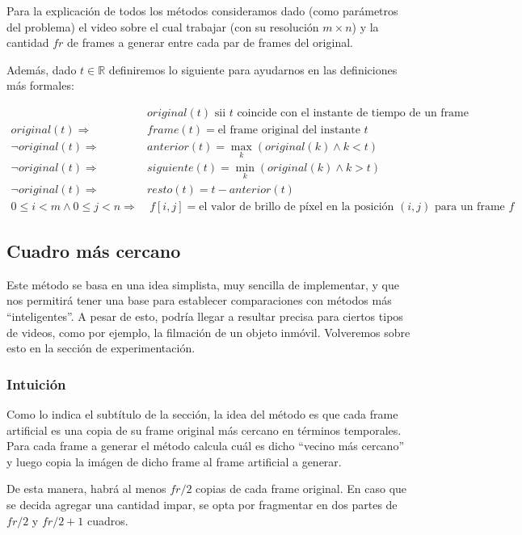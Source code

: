 Para la explicación de todos los métodos consideramos dado (como parámetros del problema) el video sobre el cual trabajar (con su resolución $m \times n$) y la cantidad $fr$ de frames a generar entre cada par de frames del original.

Además, dado $t \in \mathbb{R}$ definiremos lo siguiente para ayudarnos en las definiciones más formales:

\begin{align*}
    &original(t) \text{ sii } t \text{ coincide con el instante de tiempo de un frame original}\\
    original(t) \Rightarrow\ &frame(t)=\text{el frame original del instante $t$}\\
    \neg original(t) \Rightarrow\ &anterior(t) = \max_{k}(original(k) \wedge k < t)\\
    \neg original(t) \Rightarrow\ &siguiente(t) = \min_{k}(original(k) \wedge k > t)\\
    \neg original(t) \Rightarrow\ &resto(t) = t-anterior(t)\\
    0 \leq i < m \wedge 0 \leq j < n \Rightarrow&\ f[i,j] =\text{el valor de brillo de píxel en la posición $(i, j)$ para un frame $f$}
\end{align*}

\subsection{Cuadro m\'as cercano}

Este m\'etodo se basa en una idea simplista, muy sencilla de implementar, y que nos permitirá tener una base para establecer comparaciones con métodos más ``inteligentes''. A pesar de esto, podría llegar a resultar precisa para ciertos tipos de videos, como por ejemplo, la filmaci\'on de un objeto inmóvil. Volveremos sobre esto en la sección de experimentación.

\subsubsection*{\bf{Intuición}}

Como lo indica el subt\'itulo de la secci\'on, la idea del método es que cada frame artificial es una copia de su frame original más cercano en términos temporales. Para cada frame a generar el método calcula cuál es dicho ``vecino más cercano'' y luego copia la im\'agen de dicho frame al frame artificial a generar. 

De esta manera, habr\'a al menos $fr/2$ copias de cada frame original. En caso que se decida agregar una cantidad impar, se opta por fragmentar en dos partes de $fr/2$ y $fr/2+1$ cuadros.


